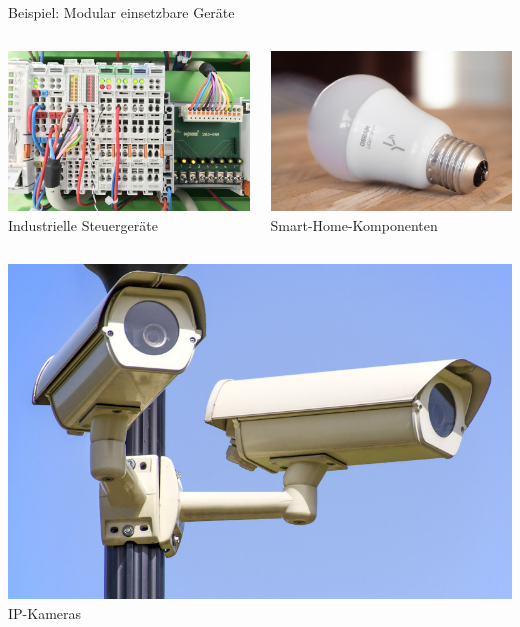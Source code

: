 {
\small

\begin{frame}{Beispiel: Modular einsetzbare Geräte}
    \begin{columns}
        \includegraphics[width=.8\textwidth]{2-hardwaredesign/img/komponenten_geraete_industriesteuerung} \\
        Industrielle Steuergeräte

        \includegraphics[width=.8\textwidth]{2-hardwaredesign/img/komponenten_geraete_smarthome} \\
        Smart-Home-Komponenten
    \end{columns}

    \bigskip

    \begin{columns}
        \includegraphics[width=.8\textwidth]{2-hardwaredesign/img/komponenten_geraete_ipkamera} \\
        IP-Kameras


\end{columns}
\end{frame}}
